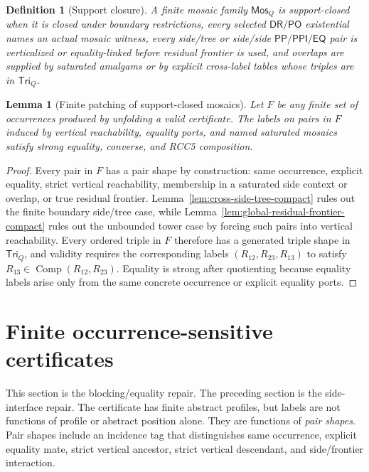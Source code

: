 \documentclass[11pt]{article}
\newtheorem{lemma}[theorem]{Lemma}
\newtheorem{definition}[theorem]{Definition}
\newcommand{\EQ}{\mathsf{EQ}}
\newcommand{\PP}{\mathsf{PP}}
\newcommand{\PPI}{\mathsf{PPI}}
\newcommand{\PO}{\mathsf{PO}}
\newcommand{\DR}{\mathsf{DR}}
\newcommand{\comp}{\operatorname{Comp}}
\newcommand{\Mos}{\mathsf{Mos}}
\newcommand{\Tri}{\mathsf{Tri}}
\begin{document}
\begin{definition}[Support closure]
A finite mosaic family \(\Mos_Q\) is support-closed when it is closed under boundary restrictions, every selected \(\DR/\PO\) existential names an actual mosaic witness, every side/tree or side/side \(\PP/\PPI/\EQ\) pair is verticalized or equality-linked before residual frontier is used, and overlaps are supplied by saturated amalgams or by explicit cross-label tables whose triples are in \(\Tri_Q\).
\end{definition}

\begin{lemma}[Finite patching of support-closed mosaics]\label{lem:patch}
Let \(F\) be any finite set of occurrences produced by unfolding a valid certificate.  The labels on pairs in \(F\) induced by vertical reachability, equality ports, and named saturated mosaics satisfy strong equality, converse, and RCC5 composition.
\end{lemma}

\begin{proof}
Every pair in \(F\) has a pair shape by construction: same occurrence, explicit equality, strict vertical reachability, membership in a saturated side context or overlap, or true residual frontier.  Lemma~\ref{lem:cross-side-tree-compact} rules out the finite boundary side/tree case, while Lemma~\ref{lem:global-residual-frontier-compact} rules out the unbounded tower case by forcing such pairs into vertical reachability.  Every ordered triple in \(F\) therefore has a generated triple shape in \(\Tri_Q\), and validity requires the corresponding labels \((R_{12},R_{23},R_{13})\) to satisfy \(R_{13}\in\comp(R_{12},R_{23})\).  Equality is strong after quotienting because equality labels arise only from the same concrete occurrence or explicit equality ports.
\end{proof}


\section{Finite occurrence-sensitive certificates}

This section is the blocking/equality repair.  The preceding section is the side-interface repair.  The certificate has finite abstract profiles, but labels are not functions of profile or abstract position alone.  They are functions of \emph{pair shapes}.  Pair shapes include an incidence tag that distinguishes same occurrence, explicit equality mate, strict vertical ancestor, strict vertical descendant, and side/frontier interaction.
\end{document}
